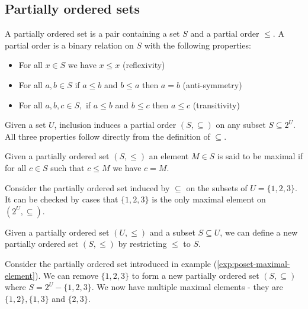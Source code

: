 \subsection{Partially ordered sets}\label{sec:appendix-poset}

\begin{defn}
 A partially ordered set is a pair containing a set $S$ and a partial order $\leq$. A partial order is a binary relation on $S$ with the following properties:
 \begin{itemize}
   \item For all $ x \in S$ we have $ x \leq x$ (reflexivity)
   \item For all $a, b \in S$ if $ a \leq b $ and $ b \leq a $ then $a = b$ (anti-symmetry)
   \item For all $ a, b, c \in S, $ if $a \leq b $ and $b \leq c$ then $ a \leq c$ (transitivity)
 \end{itemize}
 \end{defn}

 \begin{exmp}
   Given a set $U$, inclusion induces a partial order $(S, \subseteq )$ on any subset $S \subseteq 2 ^{U}$. All three properties follow directly from the definition of $\subseteq $.
 \end{exmp}

 \begin{defn}
   Given a partially ordered set $(S, \leq )$ an element $M \in S$ is said to be maximal if for all $c \in S$ such that $c\leq M$ we have $c = M.$


 \end{defn}

 \begin{exmp}\label{exp:poset-maximal-element}
   Consider the partially ordered set induced by $\subseteq$ on the subsets of $U = \{1, 2, 3\}$. It can be checked by cases that $\{1, 2, 3\}$ is the only maximal element on $(2 ^U, \subseteq )$.
 \end{exmp}


 \begin{remark}\label{rem:subsets-of-poset-are-posets}
   Given a partially ordered set $(U, \leq )$ and a subset $S \subseteq U$, we can define a new partially ordered set $(S, \leq )$ by restricting $\leq$ to $S$.
 \end{remark}

 \begin{exmp}
   Consider the partially ordered set introduced in example (\ref{exp:poset-maximal-element}). We can remove $\{1, 2, 3\}$ to form a new partially ordered set $(S, \subseteq )$ where $S = 2 ^U - \{1, 2, 3\}$. We now have multiple maximal elements - they are $\{1, 2\}, \{1, 3\}$ and $\{2, 3\}.$
 \end{exmp}

